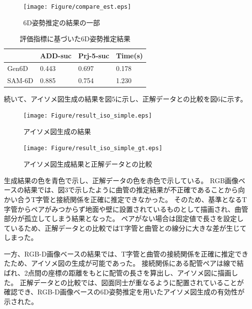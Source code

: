 \begin{figure}[htbt]
	\centering
	\texttt{[image: Figure/compare\_est.eps]}
	\caption{6D姿勢推定の結果の一部}
	\label{fig:f2}
\end{figure}

\begin{table}[h]
	\centering
	\caption{評価指標に基づいた6D姿勢推定結果}
	\begin{tabular}{|p{1.7cm}|p{1.7cm}|p{1.7cm}|p{1.7cm}|}
	\hline
	& ADD-suc & Prj-5-suc & Time(s) \\
	\hline
	Gen6D & 0.443 & 0.697 & 0.178 \\
	\hline
	SAM-6D & 0.885 & 0.754 & 1.230 \\
	\hline
	\end{tabular}
\end{table}

続いて、アイソメ図生成の結果を図5に示し、正解データとの比較を図6に示す。

\begin{figure}[htbt]
	\centering
	\texttt{[image: Figure/result\_iso\_simple.eps]}
	\caption{アイソメ図生成の結果}
	\label{fig:f2}
\end{figure}
\begin{figure}[htbt]
	\centering
	\texttt{[image: Figure/result\_iso\_simple\_gt.eps]}
	\caption{アイソメ図生成結果と正解データとの比較}
	\label{fig:f2}
\end{figure}

生成結果の色を青色で示し、正解データの色を赤色で示している。
RGB画像ベースの結果では、図3で示したように曲管の推定結果が不正確であることから向かい合うT字管と接続関係を正確に推定できなかった。
そのため、基準となるT字管からペアがみつからず地面や壁に設置されているものとして描画され、曲管部分が孤立してしまう結果となった。
ペアがない場合は固定値で長さを設定しているため、正解データとの比較ではT字管と曲管との線分に大きな差が生じてしまった。

一方、RGB-D画像ベースの結果では、T字管と曲管の接続関係を正確に推定できたため、アイソメ図の生成が可能であった。
接続関係にある配管ペアは線で結ばれ、2点間の座標の距離をもとに配管の長さを算出し、アイソメ図に描画した。
正解データとの比較では、図面同士が重なるように配置されていることが確認でき、RGB-D画像ベースの6D姿勢推定を用いたアイソメ図生成の有効性が示された。

